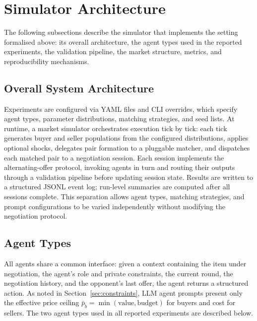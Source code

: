 
\section{Simulator Architecture}
\label{sec:design}

The following subsections describe the simulator that implements the setting formalised above: its overall architecture, the agent types used in the reported experiments, the validation pipeline, the market structure, metrics, and reproducibility mechanisms.

\subsection{Overall System Architecture}
\label{sec:architecture}

Experiments are configured via YAML files and CLI overrides, which specify agent types, parameter distributions, matching strategies, and seed lists.  At runtime, a market simulator orchestrates execution tick by tick: each tick generates buyer and seller populations from the configured distributions, applies optional shocks, delegates pair formation to a pluggable matcher, and dispatches each matched pair to a negotiation session.  Each session implements the alternating-offer protocol, invoking agents in turn and routing their outputs through a validation pipeline before updating session state.  Results are written to a structured JSONL event log; run-level summaries are computed after all sessions complete.  This separation allows agent types, matching strategies, and prompt configurations to be varied independently without modifying the negotiation protocol.

\subsection{Agent Types}
\label{sec:agents}

All agents share a common interface: given a context containing the item under negotiation, the agent's role and private constraints, the current round, the negotiation history, and the opponent's last offer, the agent returns a structured action.  As noted in Section~\ref{sec:constraints}, LLM agent prompts present only the effective price ceiling $\bar{p}_b = \min(\text{value}, \text{budget})$ for buyers and cost for sellers.  The two agent types used in all reported experiments are described below.

